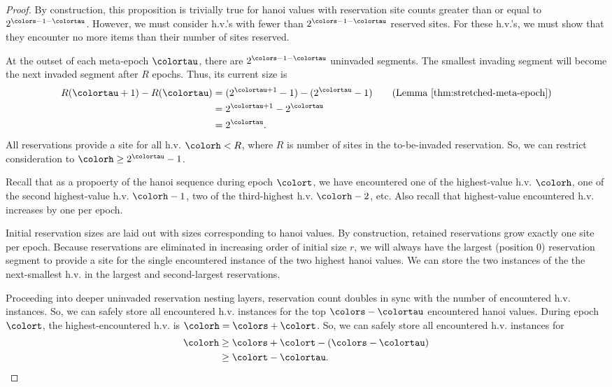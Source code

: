 \begin{proof}
By construction, this proposition is trivially true for hanoi values with reservation site counts greater than or equal to $2^{\colors-1-\colortau}$.
However, we must consider h.v.'s with fewer than $2^{\colors-1-\colortau}$ reserved sites.
For these h.v.'s, we must show that they encounter no more items than their number of sites reserved.

At the outset of each meta-epoch $\colortau$, there are $2^{\colors - 1 - \colortau}$ uninvaded segments.
The smallest invading segment will become the next invaded segment after $R$ epochs.
Thus, its current size is
\begin{align*}
R(\colortau + 1) - R(\colortau)
&= (2^{\colortau + 1} - 1) - (2^{\colortau} - 1) \tag{Lemma \ref{thm:stretched-meta-epoch}}\\
&= 2^{\colortau + 1} - 2^{\colortau}\\
&= 2^{\colortau}.
\end{align*}
All reservations provide a site for all h.v. $\colorh < R$, where $R$ is number of sites in the to-be-invaded reservation.
So, we can restrict consideration to $\colorh \geq 2^{\colortau} - 1$.

Recall that as a propoerty of the hanoi sequence during epoch $\colort$, we have encountered one of the highest-value h.v. $\colorh$, one of the second highest-value h.v. $\colorh-1$, two of the third-highest h.v. $\colorh-2$, etc.
Also recall that highest-value encountered h.v. increases by one per epoch.

Initial reservation sizes are laid out with sizes corresponding to hanoi values.
By construction, retained reservations grow exactly one site per epoch.
Because reservations are eliminated in increasing order of initial size $r$, we will always have the largest (position 0) reservation segment to provide a site for the single encountered instance of the two highest hanoi values.
We can store the two instances of the the next-smallest h.v. in the largest and second-largest reservations.

Proceeding into deeper uninvaded reservation nesting layers, reservation count doubles in sync with the number of encountered h.v. instances.
So, we can safely store all encountered h.v. instances for the top $\colors - \colortau$ encountered hanoi values.
During epoch $\colort$, the highest-encountered h.v. is $\colorh=\colors + \colort$.
So, we can safely store all encountered h.v. instances for
\begin{align*}
\colorh
&\geq
\colors + \colort - (\colors - \colortau)\\
&\geq
\colort - \colortau.
\end{align*}


\end{proof}
